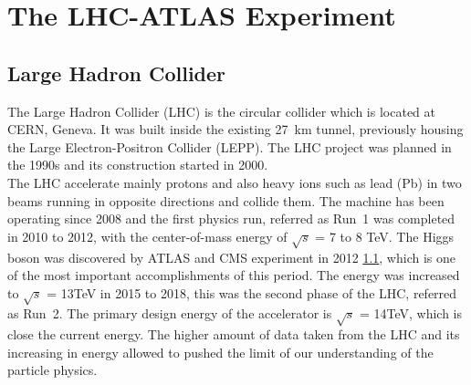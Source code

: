 \chapter{The LHC-ATLAS Experiment}
\label{chap:LHCATLAS}
\section{Large Hadron Collider}

The Large Hadron Collider (LHC) is the circular collider which is located at CERN, Geneva. It was built inside the existing 27~km tunnel, previously housing the Large Electron-Positron Collider (LEPP). The LHC project was planned in the 1990s and its construction started in 2000. \\
The LHC accelerate mainly protons and also heavy ions such as lead (Pb) in two beams running in opposite directions and collide them. 
The machine has been operating since 2008 and the first physics run, referred as Run~1 was completed in 2010 to 2012, with the center-of-mass energy of $\sqrt{s}$ = 7 to 8 TeV. The Higgs boson was discovered by ATLAS and CMS experiment in 2012 \ref{}, which is one of the most important accomplishments of this period. The energy was increased to $\sqrt{s}$ = 13TeV in 2015 to 2018, this was the second phase of the LHC, referred as Run~2. The primary design energy of the accelerator is $\sqrt{s}$ = 14TeV, which is close the current energy.
The higher amount of data taken from the LHC and its increasing in energy allowed to pushed the limit of our understanding of the particle physics. 
